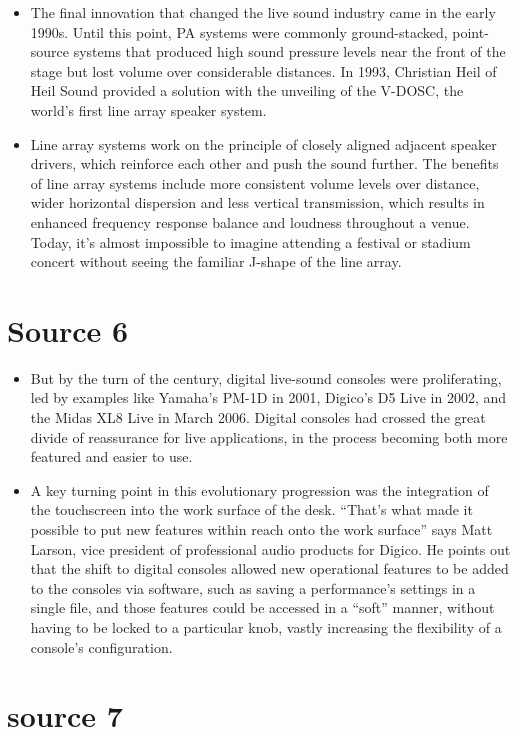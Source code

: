 \documentclass[12pt]{article}
\begin{document}
\begin{itemize}
            \item The final innovation that changed the live sound industry came in the early 1990s. Until this point, PA systems were commonly ground-stacked, point-source systems that produced high sound pressure levels near the front of the stage but lost volume over considerable distances. In 1993, Christian Heil of Heil Sound provided a solution with the unveiling of the V-DOSC, the world's first line array speaker system.
            \item Line array systems work on the principle of closely aligned adjacent speaker drivers, which reinforce each other and push the sound further. The benefits of line array systems include more consistent volume levels over distance, wider horizontal dispersion and less vertical transmission, which results in enhanced frequency response balance and loudness throughout a venue. Today, it's almost impossible to imagine attending a festival or stadium concert without seeing the familiar J-shape of the line array.
        \end{itemize}
    \newpage
    \section{Source 6 \autocite{daleyWindingRoadModern2020}}
        \begin{itemize}
            \item But by the turn of the century, digital live-sound consoles were proliferating, led by examples like Yamaha's PM-1D in 2001, Digico's D5 Live in 2002, and the Midas XL8 Live in March 2006. Digital consoles had crossed the great divide of reassurance for live applications, in the process becoming both more featured and easier to use.
            \item A key turning point in this evolutionary progression was the integration of the touchscreen into the work surface of the desk. ``That's what made it possible to put new features within reach onto the work surface'' says Matt Larson, vice president of professional audio products for Digico. He points out that the shift to digital consoles allowed new operational features to be added to the consoles via software, such as saving a performance's settings in a single file, and those features could be accessed in a “soft” manner, without having to be locked to a particular knob, vastly increasing the flexibility of a console's configuration. 
        \end{itemize}
    \newpage
    \section{source 7 \autocite{fletcherOnceTimeEvolution2014}}
\end{document}
